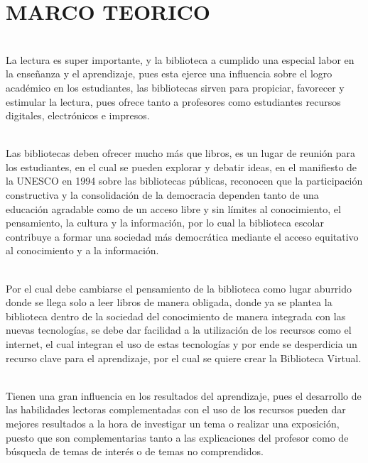 \section{MARCO TEORICO} 

\begin{enumerate}[1.]
	
	\\ La lectura es super importante, y la biblioteca a cumplido una especial labor en la enseñanza y el aprendizaje, pues esta ejerce una influencia sobre el logro académico en los estudiantes, las bibliotecas sirven para propiciar, favorecer y estimular la lectura, pues ofrece tanto a profesores como estudiantes recursos digitales, electrónicos e impresos. 
	
	\\ Las bibliotecas deben ofrecer mucho más que libros, es un lugar de reunión para los estudiantes, en el cual se pueden explorar y debatir ideas, en el manifiesto de la UNESCO en 1994 sobre las bibliotecas públicas, reconocen que la participación constructiva y la consolidación de la democracia dependen tanto de una educación agradable como de un acceso libre y sin límites al conocimiento, el pensamiento, la cultura y la información, por lo cual la biblioteca escolar contribuye a formar una sociedad más democrática mediante el acceso equitativo al conocimiento y a la información.
	
	\\ Por el cual debe cambiarse el pensamiento de la biblioteca como lugar aburrido donde se llega solo a leer libros de manera obligada, donde ya se plantea la biblioteca dentro de la sociedad del conocimiento de manera integrada con las nuevas tecnologías, se debe dar facilidad a la utilización de los recursos como el internet, el cual integran el uso de estas tecnologías y por ende se desperdicia un recurso clave para el aprendizaje, por el cual se quiere crear la Biblioteca Virtual.
	
	\\ Tienen una gran influencia en los resultados del aprendizaje, pues el desarrollo de las habilidades lectoras complementadas con el uso de los recursos pueden dar mejores resultados a la hora de investigar un tema o realizar una exposición, puesto que son complementarias tanto a las explicaciones del profesor como de búsqueda de temas de interés o de temas no comprendidos. 
	

\end{enumerate} 
